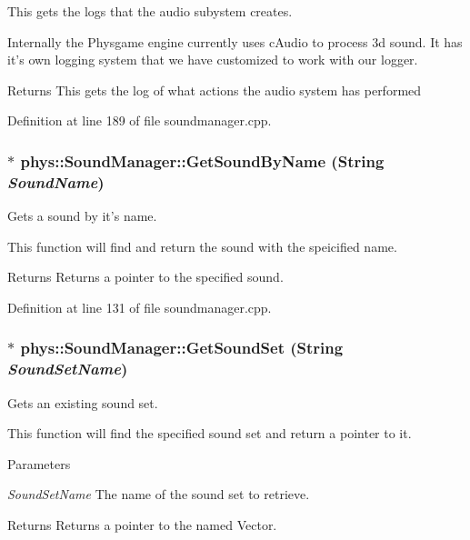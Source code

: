 This gets the logs that the audio subystem creates. 

Internally the Physgame engine currently uses cAudio to process 3d sound. It has it's own logging system that we have customized to work with our logger. \begin{DoxyReturn}{Returns}
This gets the log of what actions the audio system has performed 
\end{DoxyReturn}


Definition at line 189 of file soundmanager.cpp.

\hypertarget{classphys_1_1SoundManager_aa325440a688757ad74812b7f093e2423}{
\subsubsection[{GetSoundByName}]{ $\ast$ phys::SoundManager::GetSoundByName ({\bf String} {\em SoundName})}}
\label{d1/dc4/classphys_1_1SoundManager_aa325440a688757ad74812b7f093e2423}


Gets a sound by it's name. 

This function will find and return the sound with the speicified name. \begin{DoxyReturn}{Returns}
Returns a pointer to the specified sound. 
\end{DoxyReturn}


Definition at line 131 of file soundmanager.cpp.

\hypertarget{classphys_1_1SoundManager_a419edd2aed481ed7eff4beb11c9a6cf2}{
\subsubsection[{GetSoundSet}]{ $\ast$ phys::SoundManager::GetSoundSet ({\bf String} {\em SoundSetName})}}
\label{d1/dc4/classphys_1_1SoundManager_a419edd2aed481ed7eff4beb11c9a6cf2}


Gets an existing sound set. 

This function will find the specified sound set and return a pointer to it. 
\begin{DoxyParams}{Parameters}
\item[{\em SoundSetName}]The name of the sound set to retrieve. \end{DoxyParams}
\begin{DoxyReturn}{Returns}
Returns a pointer to the named Vector. 
\end{DoxyReturn}



